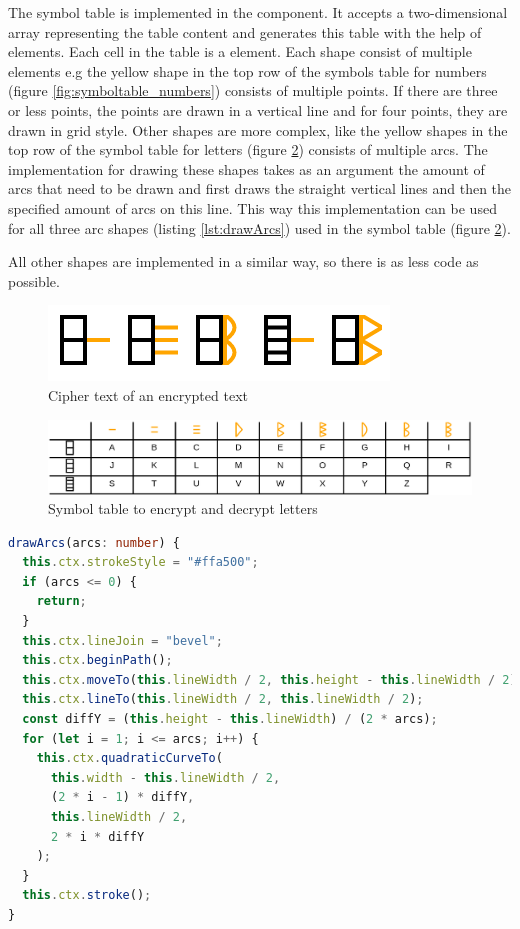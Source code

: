The symbol table is implemented in the  component. It accepts a two-dimensional array representing the table content and generates this table with the help of  elements. Each cell in the table is a  element. Each shape consist of multiple elements e.g the yellow shape in the top row of the symbols table for numbers (figure \ref{fig:symboltable_numbers}) consists of multiple points. If there are three or less points, the points are drawn in a vertical line and for four points, they are drawn in grid style. Other shapes are more complex, like the yellow shapes in the top row of the symbol table for letters (figure \ref{fig:symboltable_letters}) consists of multiple arcs. The implementation for drawing these shapes takes as an argument the amount of arcs that need to be drawn and first draws the straight vertical lines and then the specified amount of arcs on this line. This way this implementation can be used for all three arc shapes (listing \ref{lst:drawArcs}) used in the symbol table (figure \ref{fig:symboltable_letters}).

All other shapes are implemented in a similar way, so there is as less code as possible.

\begin{figure} 
    \centering
    \includegraphics[width=0.4 \columnwidth]{figures/cipher_text.png}
    \caption{Cipher text of an encrypted text} 
    \label{fig:cipher_text} 
\end{figure}

\begin{figure} 
    \centering
    \includegraphics[width=1.0 \columnwidth]{figures/symboltable_letters.png}
    \caption{Symbol table to encrypt and decrypt letters} 
    \label{fig:symboltable_letters} 
\end{figure}

\begin{lstlisting}[language=TypeScript,caption={Implementation of drawing a variable amount of arc symbols},label={lst:drawArcs}]
drawArcs(arcs: number) {
  this.ctx.strokeStyle = "#ffa500";
  if (arcs <= 0) {
    return;
  }
  this.ctx.lineJoin = "bevel";
  this.ctx.beginPath();
  this.ctx.moveTo(this.lineWidth / 2, this.height - this.lineWidth / 2);
  this.ctx.lineTo(this.lineWidth / 2, this.lineWidth / 2);
  const diffY = (this.height - this.lineWidth) / (2 * arcs);
  for (let i = 1; i <= arcs; i++) {
    this.ctx.quadraticCurveTo(
      this.width - this.lineWidth / 2,
      (2 * i - 1) * diffY,
      this.lineWidth / 2,
      2 * i * diffY
    );
  }
  this.ctx.stroke();
}
\end{lstlisting}

